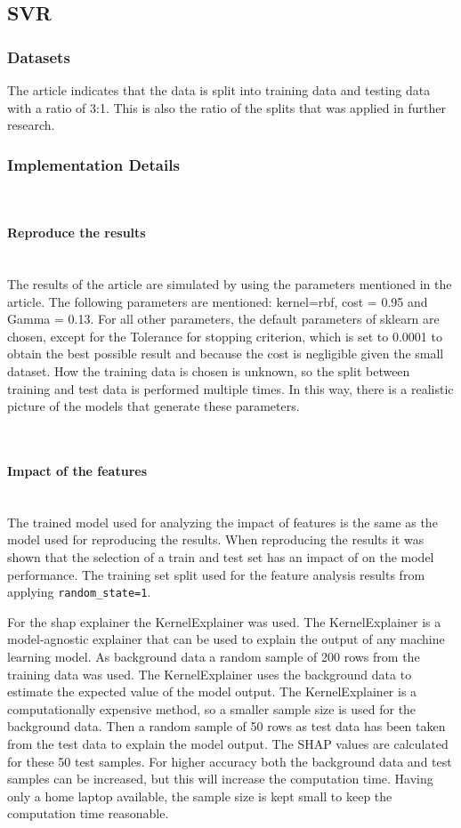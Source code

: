 \documentclass{article}
\newcommand{\subsubsubsection}[1]{%
  \paragraph{#1}\mbox{}\\}
\begin{document}
\subsection{SVR}

\subsubsection{Datasets}
The article indicates that the data is split into training data and testing data with a ratio of 3:1. This is also the ratio of the splits that was applied in further research.

\subsubsection{Implementation Details}

\subsubsubsection{Reproduce the results}
The results of the article are simulated by using the parameters mentioned in the article. The following parameters are mentioned: kernel=rbf, cost = 0.95 and Gamma = 0.13. For all other parameters, the default parameters of sklearn are chosen, except for the Tolerance for stopping criterion, which is set to 0.0001 to obtain the best possible result and because the cost is negligible given the small dataset.
How the training data is chosen is unknown, so the split between training and test data is performed multiple times. In this way, there is a realistic picture of the models that generate these parameters.

\subsubsubsection{Impact of the features}
The trained model used for analyzing the impact of features is the same as the model used for reproducing the results.
When reproducing the results it was shown that the selection of a train and test set has an impact of on the model performance.
The training set split used for the feature analysis results from applying {\texttt{random\_state=1}}.

For the shap explainer the KernelExplainer was used.
The KernelExplainer is a model-agnostic explainer that can be used to explain the output of any machine learning model.
As background data a random sample of 200 rows from the training data was used.
The KernelExplainer uses the background data to estimate the expected value of the model output.
The KernelExplainer is a computationally expensive method, so a smaller sample size is used for the background data.
Then a random sample of 50 rows as test data has been taken from the test data to explain the model output.
The SHAP values are calculated for these 50 test samples.
For higher accuracy both the background data and test samples can be increased, but this will increase the computation time.
Having only a home laptop available, the sample size is kept small to keep the computation time reasonable.
\end{document}
